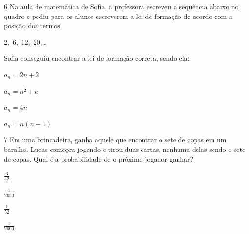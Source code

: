 \num{6} Na aula de matemática de Sofia, a professora escreveu a sequência
abaixo no quadro e pediu para os alunos escreverem a lei de formação de
acordo com a posição dos termos.

2,\ 6,\ 12,\ 20,\ldots

Sofia conseguiu encontrar a lei de formação correta, sendo ela:

\begin{escolha}
\item $a_{n} = 2n + 2$
\item $a_{n} = n² + n$
\item $a_{n} = 4n$
\item $a_{n} = n(n - 1)$
\end{escolha}



\num{7} Em uma brincadeira, ganha aquele que encontrar o sete de copas em um
baralho. Lucas começou jogando e tirou duas cartas, nenhuma delas sendo
o sete de copas. Qual é a probabilidade de o próximo jogador ganhar?

\begin{escolha}
\item $\frac{3}{52}$
\item $\frac{1}{2650}$
\item $\frac{1}{52}$
\item $\frac{1}{2600}$
\end{escolha}


